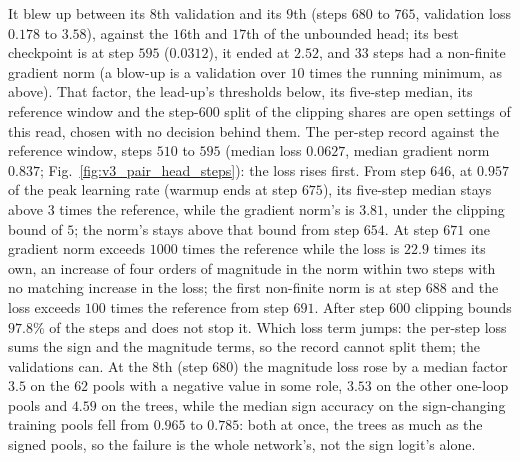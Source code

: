 \documentclass[11pt]{article}
\begin{document}
\begin{itemize}
    It blew up between its $8$th validation and its $9$th (steps $680$ to $765$, validation loss $0.178$ to $3.58$),
    against the $16$th and $17$th of the unbounded head; its best checkpoint is at step $595$ ($0.0312$), it ended at
    $2.52$, and $33$ steps had a non-finite gradient norm (a blow-up is a validation over $10$ times the running
    minimum, as above). That factor, the lead-up's thresholds below, its five-step median, its reference window
    and the step-$600$ split of the clipping shares are open settings of this read, chosen with no decision behind
    them. The per-step record against the reference window, steps $510$ to $595$ (median loss $0.0627$,
    median gradient norm $0.837$; Fig.~\ref{fig:v3_pair_head_steps}): the loss rises first. From step $646$, at $0.957$
    of the peak learning rate (warmup ends at step $675$), its five-step median stays above $3$ times the reference,
    while the gradient norm's is $3.81$, under the clipping bound of $5$; the norm's stays above that bound from step
    $654$. At step $671$ one gradient norm exceeds $1000$ times the reference while the loss is $22.9$ times its own,
    an increase of four orders of magnitude in the norm within two steps with no matching increase in the loss; the first non-finite norm is at step
    $688$ and the loss exceeds $100$ times the reference from step $691$. After step $600$ clipping bounds $97.8\%$ of
    the steps and does not stop it. Which loss term jumps: the per-step loss sums the sign and the magnitude terms, so
    the record cannot split them; the validations can. At the $8$th (step $680$) the magnitude loss rose by a median
    factor $3.5$ on the $62$ pools with a negative value in some role, $3.53$ on the other one-loop pools and $4.59$ on
    the trees, while the median sign accuracy on the sign-changing training pools fell from $0.965$ to $0.785$: both
    at once, the trees as much as the signed pools, so the failure is the whole network's, not the sign logit's alone.

\end{itemize}
\end{document}
